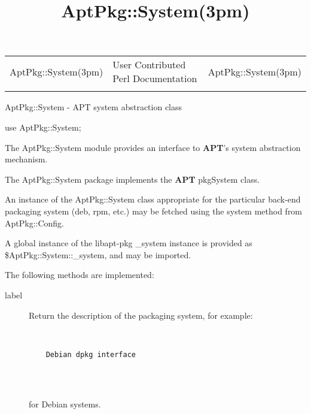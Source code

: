 \documentclass[]{article}
\title{AptPkg::System(3pm)}
\author{}
\date{}
\let\realtextbf=\textbf
\renewcommand{\textbf}[1]{\textcolor{boldcolor}{\realtextbf{#1}}}
\begin{document}
\maketitle

\begin{longtable}[c]{@{}lll@{}}
\toprule\addlinespace
AptPkg::System(3pm) & User Contributed Perl Documentation &
AptPkg::System(3pm)
\\\addlinespace
\bottomrule
\end{longtable}


AptPkg::System - APT system abstraction class


use AptPkg::System;


The AptPkg::System module provides an interface to \textbf{APT}'s system
abstraction mechanism.


The AptPkg::System package implements the \textbf{APT} pkgSystem class.

An instance of the AptPkg::System class appropriate for the particular
back-end packaging system (deb, rpm, etc.) may be fetched using the
system method from AptPkg::Config.

A global instance of the libapt-pkg \_system instance is provided as
\$AptPkg::System::\_system, and may be imported.

The following methods are implemented:

\begin{description}
\item[label]
Return the description of the packaging system, for example:

~

\begin{verbatim}
    Debian dpkg interface
    
\end{verbatim}

~

for Debian systems.
\end{description}
\end{document}
